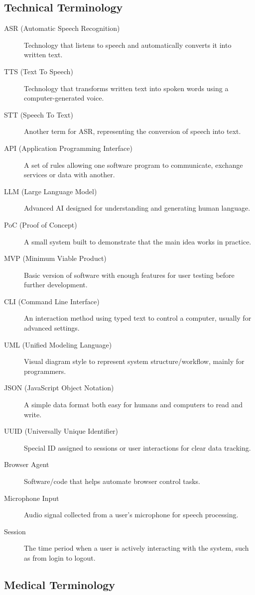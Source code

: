 \documentclass[11pt]{article}
\begin{document}
\subsection*{Technical Terminology}

\begin{description}
  \item[ASR (Automatic Speech Recognition)] Technology that listens to speech and automatically converts it into written text.
  \item[TTS (Text To Speech)] Technology that transforms written text into spoken words using a computer-generated voice.
  \item[STT (Speech To Text)] Another term for ASR, representing the conversion of speech into text.
  \item[API (Application Programming Interface)] A set of rules allowing one software program to communicate, exchange services or data with another.
  \item[LLM (Large Language Model)] Advanced AI designed for understanding and generating human language.
  \item[PoC (Proof of Concept)] A small system built to demonstrate that the main idea works in practice.
  \item[MVP (Minimum Viable Product)] Basic version of software with enough features for user testing before further development.
  \item[CLI (Command Line Interface)] An interaction method using typed text to control a computer, usually for advanced settings.
  \item[UML (Unified Modeling Language)] Visual diagram style to represent system structure/workflow, mainly for programmers.
  \item[JSON (JavaScript Object Notation)] A simple data format both easy for humans and computers to read and write.
  \item[UUID (Universally Unique Identifier)] Special ID assigned to sessions or user interactions for clear data tracking.
  \item[Browser Agent] Software/code that helps automate browser control tasks.
  \item[Microphone Input] Audio signal collected from a user’s microphone for speech processing.
  \item[Session] The time period when a user is actively interacting with the system, such as from login to logout.
\end{description}

\subsection*{Medical Terminology}
\end{document}
